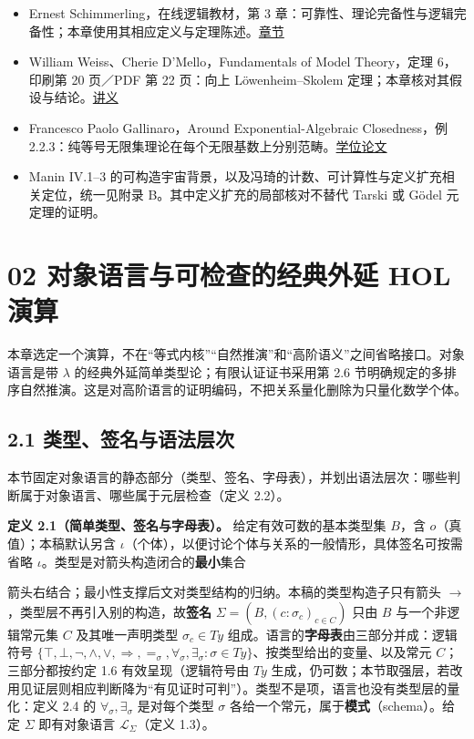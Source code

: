 \documentclass[UTF8,a4paper,zihao=-4,fontset=windows,openany]{ctexbook}
\newcommand{\mcsorigin}[1]{\par\noindent{\small\color{black!55}#1}\par\addvspace{0.8em}}
\newcommand{\mcsdisplay}[1]{%
  \par\addvspace{0.7em}%
  \sbox{\mcsmathbox}{\ensuremath{\displaystyle #1}}%
  \ifdim\wd\mcsmathbox>\linewidth
    \noindent\resizebox{\linewidth}{!}{\usebox{\mcsmathbox}}%
  \else
    \noindent\hspace*{\fill}\usebox{\mcsmathbox}\hspace*{\fill}%
  \fi
  \par\addvspace{0.7em}%
}
\def\ensuremath#1{#1}%
\def\mathrm#1{#1}%
\begin{document}
\begin{itemize}
\item Ernest Schimmerling，在线逻辑教材，第 3 章：可靠性、理论完备性与逻辑完备性；本章使用其相应定义与定理陈述。\href{https://www.math.cmu.edu/\textasciitilde{}eschimme/300Book/300-Page-3.html}{章节}
\item William Weiss、Cherie D’Mello，Fundamentals of Model Theory，定理 6，印刷第 20 页／PDF 第 22 页：向上 Löwenheim–Skolem 定理；本章核对其假设与结论。\href{https://people.math.sc.edu/mcnulty/modeltheory/WeissDMello.pdf}{讲义}
\item Francesco Paolo Gallinaro，Around Exponential-Algebraic Closedness，例 2.2.3：纯等号无限集理论在每个无限基数上分别范畴。\href{https://etheses.whiterose.ac.uk/id/eprint/31077/1/Gallinaro\_FP\_Mathematics\_PhD\_2022.pdf}{学位论文}
\item Manin IV.1–3 的可构造宇宙背景，以及冯琦的计数、可计算性与定义扩充相关定位，统一见附录 B。其中定义扩充的局部核对不替代 Tarski 或 Gödel 元定理的证明。
\end{itemize}
\clearpage\chapter{02 对象语言与可检查的经典外延 HOL 演算}
\mcsorigin{原章节：02-对象语言：简单类型论.md}
本章选定一个演算，不在“等式内核”“自然推演”和“高阶语义”之间省略接口。对象语言是带 \(\lambda\) 的经典外延简单类型论；有限认证证书采用第 2.6 节明确规定的多排序自然推演。这是对高阶语言的证明编码，不把关系量化删除为只量化数学个体。

\section{2.1 类型、签名与语法层次}
本节固定对象语言的静态部分（类型、签名、字母表），并划出语法层次：哪些判断属于对象语言、哪些属于元层检查（定义 2.2）。

\textbf{定义 2.1（简单类型、签名与字母表）。} 给定有效可数的基本类型集 \(B\)，含 \(o\)（真值）；本稿默认另含 \(\iota\)（个体），以便讨论个体与关系的一般情形，具体签名可按需省略 \(\iota\)。类型是对箭头构造闭合的\textbf{最小}集合


\mcsdisplay{\mathrm{Ty}=B\cup\{\sigma\to\tau:\sigma,\tau\in\mathrm{Ty}\}.}
\noindent 箭头右结合；最小性支撑后文对类型结构的归纳。本稿的类型构造子只有箭头 \(\to\)，类型层不再引入别的构造，故\textbf{签名} \(\Sigma=(B,(c:\sigma_c)_{c\in C})\) 只由 \(B\) 与一个非逻辑常元集 \(C\) 及其唯一声明类型 \(\sigma_c\in\mathrm{Ty}\) 组成。语言的\textbf{字母表}由三部分并成：逻辑符号 \(\{\top,\bot,\neg,\wedge,\vee,\Rightarrow,=_\sigma,\forall_\sigma,\exists_\sigma:\sigma\in\mathrm{Ty}\}\)、按类型给出的变量、以及常元 \(C\)；三部分都按约定 1.6 有效呈现（逻辑符号由 \(\mathrm{Ty}\) 生成，仍可数；本节取强层，若改用见证层则相应判断降为“有见证时可判”）。类型不是项，语言也没有类型层的量化：定义 2.4 的 \(\forall_\sigma,\exists_\sigma\) 是对每个类型 \(\sigma\) 各给一个常元，属于\textbf{模式}（schema）。给定 \(\Sigma\) 即有对象语言 \(\mathcal L_\Sigma\)（定义 1.3）。
\end{document}
